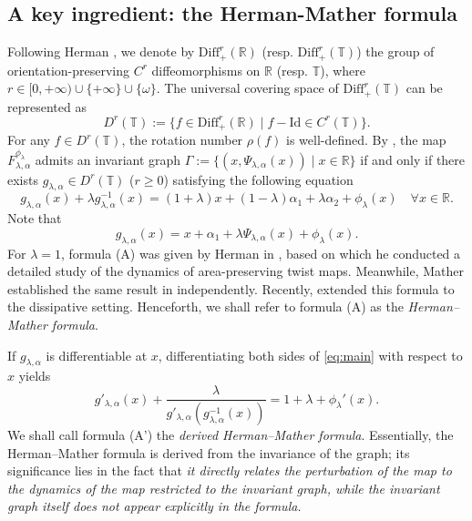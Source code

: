 \documentclass{amsart}
\begin{document}
	\subsection{A key ingredient: the Herman-Mather formula}
	Following Herman \cite{H79}, we denote by \(\mathrm{Diff}^r_+(\mathbb{R})\) (resp. \(\mathrm{Diff}^r_+(\mathbb{T})\)) the group of orientation-preserving \(C^r\) diffeomorphisms on \(\mathbb{R}\) (resp. \(\mathbb{T}\)), where \(r \in [0,+\infty) \cup \{+\infty\} \cup \{\omega\}\). The universal covering space of \(\mathrm{Diff}^r_+(\mathbb{T})\) can be represented as
	\[
	D^r(\mathbb{T}) := \{f \in \mathrm{Diff}^r_+(\mathbb{R}) \mid f - \mathrm{Id} \in C^r(\mathbb{T})\}.
	\]
	For any \(f \in D^r(\mathbb{T})\), the rotation number \(\rho(f)\) is well-defined. By \cite[Proposition 2.1]{SoW},
	the map \(F_{\lambda,\alpha}^{\phi_{\lambda}}\) admits an invariant graph \(\Gamma := \{(x, \Psi_{\lambda,\alpha}(x)) \mid x \in \mathbb{R}\}\) if and only if there exists \(g_{\lambda,\alpha} \in D^r(\mathbb{T})\) ($r\geq 0$) satisfying the following equation
	\begin{equation}\tag{A}\label{eq:main}
		g_{\lambda,\alpha}(x) + \lambda g_{\lambda,\alpha}^{-1}(x) = (1+\lambda)x + (1-\lambda)\alpha_1 + \lambda\alpha_2 + \phi_{\lambda}(x) \quad \forall x \in \mathbb{R}.
	\end{equation}
	Note that
	\[
	g_{\lambda,\alpha}(x) = x + \alpha_1 + \lambda \Psi_{\lambda,\alpha}(x) + \phi_\lambda(x).
	\]
	For $\lambda = 1$, formula (A) was given by Herman in \cite[Chapter II]{H83}, based on which he conducted a detailed study of the dynamics of area-preserving twist maps. Meanwhile, Mather established the same result in \cite{M84} independently. Recently, \cite{SoW} extended this formula to the dissipative setting. Henceforth, we shall refer to formula (A) as the {\it Herman--Mather formula}.
	
	
	If \(g_{\lambda,\alpha}\) is differentiable at \(x\), differentiating both sides of \eqref{eq:main} with respect to \(x\) yields
	\begin{equation}\tag{A'}\label{gdiff}
		g'_{\lambda,\alpha}(x) + \frac{\lambda}{g'_{\lambda,\alpha}(g_{\lambda,\alpha}^{-1}(x))} = 1+\lambda + \phi_\lambda'(x).
	\end{equation}
	We shall call formula (A') the {\it derived Herman--Mather formula}. Essentially, the Herman--Mather formula is derived from the invariance of the graph; its significance lies in the fact that {\it it directly relates the perturbation of the map to the dynamics of the map restricted to the invariant graph, while the invariant graph itself does not appear explicitly in the formula.}
	
\end{document}
